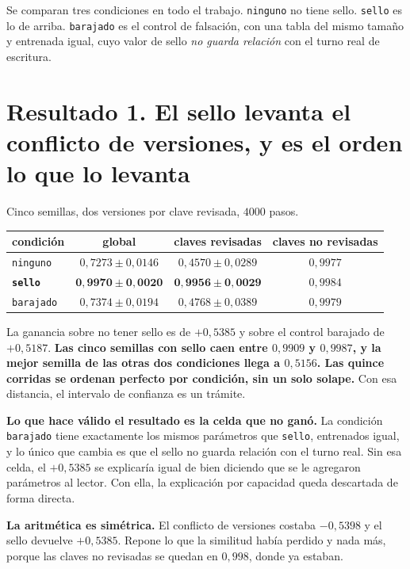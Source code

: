 \documentclass[11pt,a4paper]{article}
\begin{document}
Se comparan tres condiciones en todo el trabajo. \texttt{ninguno} no tiene sello. \texttt{sello} es lo
de arriba. \texttt{barajado} es el control de falsación, con una tabla del mismo tamaño y entrenada
igual, cuyo valor de sello \emph{no guarda relación} con el turno real de escritura.

\section{Resultado 1. El sello levanta el conflicto de versiones, y es el orden lo que lo levanta}

Cinco semillas, dos versiones por clave revisada, $4000$ pasos.

\begin{center}
\begin{tabular}{lccc}
\toprule
condición & global & \textbf{claves revisadas} & claves no revisadas \\
\midrule
\texttt{ninguno} & $0{,}7273 \pm 0{,}0146$ & $0{,}4570 \pm 0{,}0289$ & $0{,}9977$ \\
\textbf{\texttt{sello}} & $\mathbf{0{,}9970 \pm 0{,}0020}$ & $\mathbf{0{,}9956 \pm 0{,}0029}$ & $0{,}9984$ \\
\texttt{barajado} & $0{,}7374 \pm 0{,}0194$ & $0{,}4768 \pm 0{,}0389$ & $0{,}9979$ \\
\bottomrule
\end{tabular}
\end{center}

La ganancia sobre no tener sello es de $+0{,}5385$ y sobre el control barajado de $+0{,}5187$.
\textbf{Las cinco semillas con sello caen entre $0{,}9909$ y $0{,}9987$, y la mejor semilla de las
otras dos condiciones llega a $0{,}5156$. Las quince corridas se ordenan perfecto por condición, sin
un solo solape.} Con esa distancia, el intervalo de confianza es un trámite.

\textbf{Lo que hace válido el resultado es la celda que no ganó.} La condición \texttt{barajado} tiene
exactamente los mismos parámetros que \texttt{sello}, entrenados igual, y lo único que cambia es que el
sello no guarda relación con el turno real. Sin esa celda, el $+0{,}5385$ se explicaría igual de bien
diciendo que se le agregaron parámetros al lector. Con ella, la explicación por capacidad queda
descartada de forma directa.

\textbf{La aritmética es simétrica.} El conflicto de versiones costaba $-0{,}5398$ y el sello devuelve
$+0{,}5385$. Repone lo que la similitud había perdido y nada más, porque las claves no revisadas se
quedan en $0{,}998$, donde ya estaban.
\end{document}
